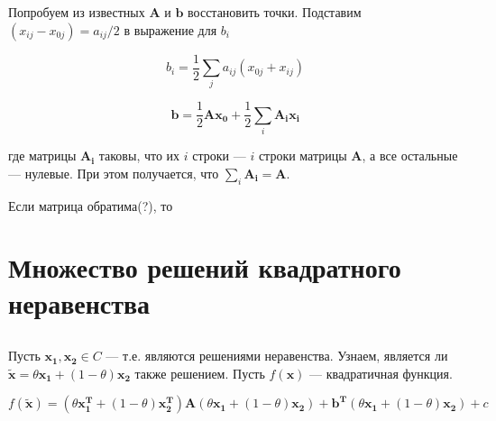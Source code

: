 	Попробуем из известных $\mathbf{A}$ и $\mathbf{b}$ восстановить точки.
	Подставим $ (x_{ij}-x_{0j}) = a_{ij}/2$ в выражение для $b_i$
	
	\begin{equation}
	b_i = \frac 12 \sum\limits_{j} a_{ij} (x_{0j}+x_{ij}) 
	\end{equation}
	
	\begin{equation}
	\mathbf{b} = \frac 12 \mathbf{A} \mathbf{x_0} + \frac 12 \sum_i \mathbf{A_i}
	\mathbf{x_i}
	\end{equation}
	
	где матрицы $\mathbf{A_i}$ таковы, что их $i$ строки --- $i$ строки матрицы
	$\mathbf{A}$, а все остальные --- нулевые. При этом получается, что
	$\sum\limits_i \mathbf{A_i} = \mathbf{A}$.
	
	Если матрица обратима(?), то
	
	\subsection{}
	
	\subsection{}
	
	\section{Множество решений квадратного неравенства}
	
	\subsection{}
	
	Пусть $\mathbf{x_1}, \mathbf{x_2} \in C$ --- т.е. являются решениями
	неравенства. Узнаем, является ли $\mathbf{\tilde{x}} = \theta \mathbf{x_1} +
	(1-\theta)\mathbf{x_2}$ также решением. Пусть $f(\mathbf{x})$ --- квадратичная
	функция.
	
	\begin{equation}
	f(\mathbf{\tilde{x}}) = (\theta \mathbf{x_1^T} + (1-\theta)\mathbf{x_2^T})
	\mathbf{A} (\theta \mathbf{x_1} + (1-\theta)\mathbf{x_2})+ \mathbf{b^T} (\theta
	\mathbf{x_1} + (1-\theta)\mathbf{x_2}) + c
	\end{equation}
	
